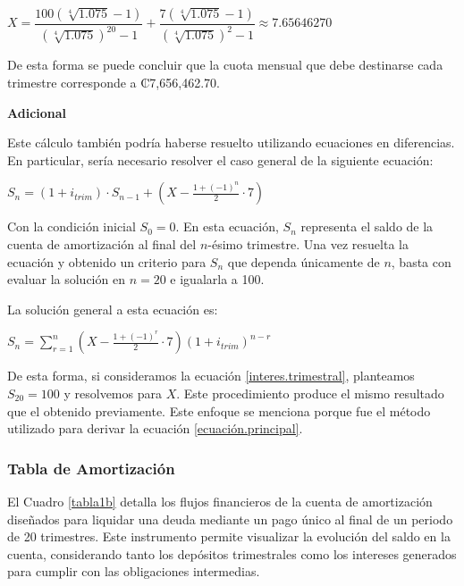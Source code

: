\documentclass[12pt]{article}
\newcommand{\prts}[1]{\left( #1 \right)} %
\begin{document}
    \begin{center}
        $X = \dfrac{100\prts{\sqrt[4]{1.075} -1}}{\prts{\sqrt[4]{1.075}}^{20}-1} + \dfrac{7\prts{\sqrt[4]{1.075} -1}}{\prts{\sqrt[4]{1.075}}^{2}-1} \approx 7.65646270$
    \end{center}

De esta forma se puede concluir que la cuota mensual que debe destinarse cada trimestre corresponde a ₡{7,656,462.70}.%

\textbf{Adicional}

Este cálculo también podría haberse resuelto utilizando ecuaciones en diferencias. En particular, sería necesario resolver el caso general de la siguiente ecuación:

\begin{center}
    $S_n = (1+i_{trim})\cdot S_{n-1} + \left(X - \frac{1+(-1)^n}{2} \cdot 7 \right)$
\end{center}
        
Con la condición inicial \( S_0 = 0 \). En esta ecuación, \( S_n \) representa el saldo de la cuenta de amortización al final del \( n \)-ésimo trimestre. Una vez resuelta la ecuación y obtenido un criterio para \( S_n \) que dependa únicamente de \( n \), basta con evaluar la solución en \( n=20 \) e igualarla a 100.

La solución general a esta ecuación es:
        
\begin{center}
    $S_n = \displaystyle\sum_{r=1}^n \left(X - \frac{1+(-1)^r}{2} \cdot 7 \right)(1+i_{trim})^{n-r}$
\end{center}
        
De esta forma, si consideramos la ecuación \eqref{interes.trimestral}, planteamos \( S_{20} = 100 \) y resolvemos para \( X \). Este procedimiento produce el mismo resultado que el obtenido previamente. Este enfoque se menciona porque fue el método utilizado para derivar la ecuación \eqref{ecuación.principal}.

\subsubsection{Tabla de Amortización}

El Cuadro \ref{tabla1b} detalla los flujos financieros de la cuenta de amortización diseñados para liquidar una deuda mediante un pago único al final de un periodo de 20 trimestres. Este instrumento permite visualizar la evolución del saldo en la cuenta, considerando tanto los depósitos trimestrales como los intereses generados para cumplir con las obligaciones intermedias.
\end{document}
